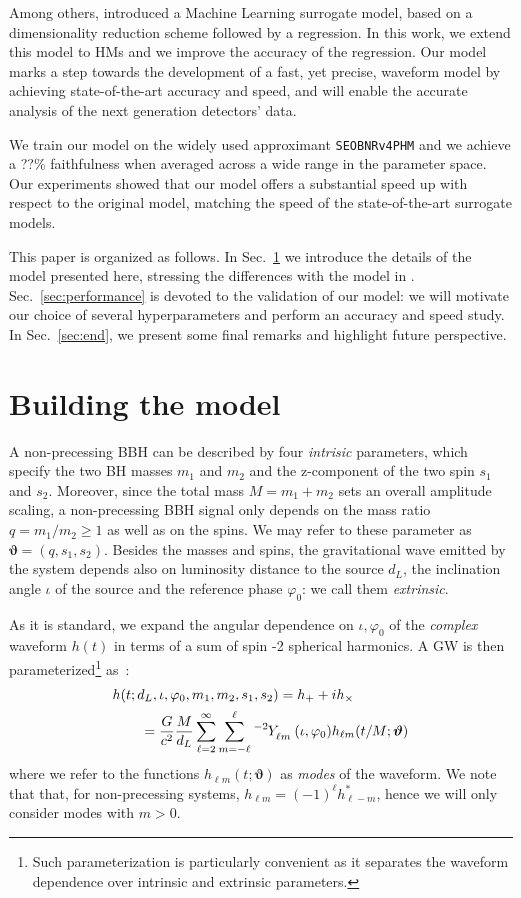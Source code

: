 \documentclass[twocolumn,showpacs,preprintnumbers,nofootinbib,prd,
superscriptaddress,10pt]{revtex4-1}
\begin{document}
Among others, \cite{Schmidt:2020yuu} introduced a Machine Learning surrogate model, based on a dimensionality reduction scheme followed by a regression. In this work, we extend this model to HMs and we improve the accuracy of the regression. Our model marks a step towards the development of a fast, yet precise, waveform model by achieving state-of-the-art accuracy and speed, and will enable the accurate analysis of the next generation detectors' data.

We train our model on the widely used approximant \texttt{SEOBNRv4PHM} and we achieve a ??\% faithfulness when averaged across a wide range in the parameter space.
Our experiments showed that our model offers a substantial speed up with respect to the original model, matching the speed of the state-of-the-art surrogate models.

This paper is organized as follows. In Sec.~\ref{sec:model} we introduce the details of the model presented here, stressing the differences with the model in  \cite{Schmidt:2020yuu}.
Sec.~\ref{sec:performance} is devoted to the validation of our model: we will motivate our choice of several hyperparameters and perform an accuracy and speed study.
In Sec.~\ref{sec:end}, we present some final remarks and highlight future perspective.

\section{Building the model}
\label{sec:model}

A non-precessing BBH can be described by four {\it intrisic} parameters, which specify the two BH masses $m_1$ and $m_2$ and the z-component of the two spin $s_1$ and $s_2$.
Moreover, since the total mass $M = m_1 + m_2$ sets an overall amplitude scaling, a non-precessing BBH signal only depends on the mass ratio $q = m_1/m_2 \geq 1$ as well as on the spins. We may refer to these parameter as $\boldsymbol{\vartheta} = (q, s_1, s_2)$.
Besides the masses and spins, the gravitational wave emitted by the system depends also on luminosity distance to the source $d_L$, the inclination angle $\iota$ of the source and the reference phase $\varphi_0$: we call them {\it extrinsic}.

As it is standard, we expand the angular dependence on $\iota, \varphi_0$ of the {\it complex} waveform $h(t)$ in terms of a sum of spin -2 spherical harmonics.
A GW is then parameterized\footnote{Such parameterization is particularly convenient as it separates the waveform dependence over intrinsic and extrinsic parameters.} as~\cite{Estelles:2021gvs}:
\begin{align} \label{eq:h_parametrization}
	&h(t; d_L,\iota,\varphi_0, m_1, m_2, s_1, s_2) = h_+ + i h_\times \nonumber \\
		&\qquad= \frac{G}{c^2} \frac{M}{d_L}\sum_{\ell = 2}^{\infty} \sum_{m = -\ell}^{\ell} \tensor[^{-2}]{Y}{_{\ell m}}(\iota, \varphi_0) h_{\ell m}(t/M; \boldsymbol{\vartheta})
\end{align}
where we refer to the functions $h_{\ell m}(t; \boldsymbol{\vartheta})$ as {\it modes} of the waveform. We note that that, for non-precessing systems, $h_{\ell m} = (-1)^\ell h^*_{\ell -m}$, hence we will only consider modes with $m>0$.
\end{document}
